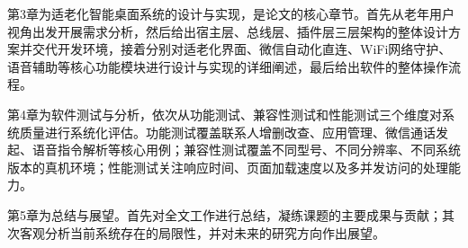 第3章为适老化智能桌面系统的设计与实现，是论文的核心章节。首先从老年用户视角出发开展需求分析，然后给出宿主层、总线层、插件层三层架构的整体设计方案并交代开发环境，接着分别对适老化界面、微信自动化直连、WiFi网络守护、语音辅助等核心功能模块进行设计与实现的详细阐述，最后给出软件的整体操作流程。

第4章为软件测试与分析，依次从功能测试、兼容性测试和性能测试三个维度对系统质量进行系统化评估。功能测试覆盖联系人增删改查、应用管理、微信通话发起、语音指令解析等核心用例；兼容性测试覆盖不同型号、不同分辨率、不同系统版本的真机环境；性能测试关注响应时间、页面加载速度以及多并发访问的处理能力。

第5章为总结与展望。首先对全文工作进行总结，凝练课题的主要成果与贡献；其次客观分析当前系统存在的局限性，并对未来的研究方向作出展望。
